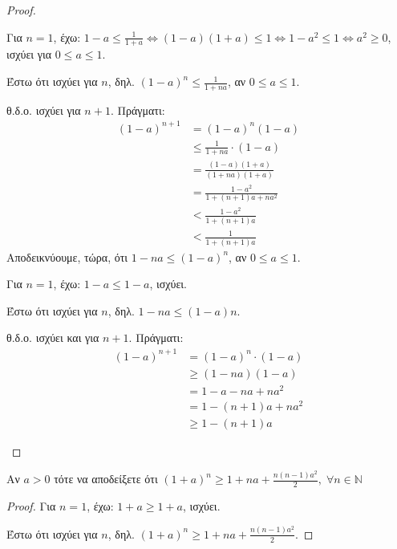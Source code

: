 \begin{multicols}{2}
\begin{enumerate}
\begin{proof}
\begin{enumerate}
          Για $ n=1 $, έχω: $ 1-a \leq \frac{1}{1+a} 
          \Leftrightarrow (1-a)(1+a) \leq 1 \Leftrightarrow 
          1-a^{2} \leq 1 \Leftrightarrow a^{2} \geq 0  $, ισχύει
          για $ 0 \leq a \leq 1 $. 

          Έστω ότι ισχύει για $n$, δηλ. $ (1-a)^{n} \leq
          \frac{1}{1+na} $, αν $ 0 \leq a \leq 1 $.

          θ.δ.ο. ισχύει για $ n+1 $. Πράγματι: 
          \begin{align*}
            (1-a)^{n+1} &= (1-a)^{n}(1-a) \\
                        &\leq \frac{1}{1+na} \cdot (1-a) \\
                        &= \frac{(1-a)(1+a)}{(1+na)(1+a)} \\
                        &= \frac{1-a^{2}}{1+(n+1)a +na^{2}} \\
                        &< \frac{1-a^{2}}{1 + (n+1)a} \\
                        &< \frac{1}{1 + (n+1)a} 
          \end{align*}
          Αποδεικνύουμε, τώρα, ότι $ 1-na \leq (1-a)^{n} $, αν 
          $ 0 \leq a \leq 1 $. 

          Για $ n=1 $, έχω: $ 1-a \leq 1-a $, ισχύει.

          Έστω ότι ισχύει για $n$, δηλ. $ 1-na \leq (1-a){n} $.

          θ.δ.ο. ισχύει και για $ n+1 $. Πράγματι:
          \begin{align*}
            (1-a)^{n+1}&=(1-a)^{n}\cdot (1-a) \\
                       &\geq (1-na)(1-a) \\
                       &=1-a-na+na^{2} \\
                       &= 1-(n+1)a + na^{2} \\
                       &\geq 1-(n+1)a
          \end{align*}
      \end{enumerate}
    \end{proof}

  \item \textcolor{Col1}{Αν $a > 0$ τότε να αποδείξετε ότι $ (1+a)^{n} 
    \geq 1 + na + \frac{n(n-1)a^{2}}{2},\; \forall n \in \mathbb{N}$}
    \begin{proof}
    \item {}
      Για $ n=1 $, έχω: $ 1+a \geq 1+a $, ισχύει.

      Έστω ότι ισχύει για $n$, δηλ. $ (1+a)^{n} \geq 1+na +
      \frac{n(n-1)a^{2}}{2} $.


\end{proof}
\end{enumerate}
\end{multicols}
